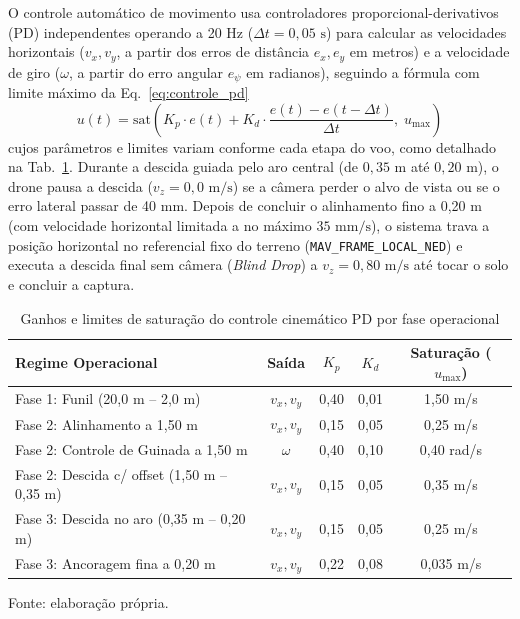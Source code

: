 O controle automático de movimento usa controladores proporcional-derivativos (PD) independentes operando a 20 Hz ($\Delta t = 0,05\text{ s}$) para calcular as velocidades horizontais ($v_x, v_y$, a partir dos erros de distância $e_x, e_y$ em metros) e a velocidade de giro ($\omega$, a partir do erro angular $e_\psi$ em radianos), seguindo a fórmula com limite máximo da Eq.~\eqref{eq:controle_pd}
\begin{equation}
	u(t) = \text{sat}\left(K_p \cdot e(t) + K_d \cdot \frac{e(t) - e(t - \Delta t)}{\Delta t},\; u_{\max}\right)
	\label{eq:controle_pd}
\end{equation}
cujos parâmetros e limites variam conforme cada etapa do voo, como detalhado na Tab.~\ref{tab:ganhos_controle_pd}. Durante a descida guiada pelo aro central (de $0,35\text{ m}$ até $0,20\text{ m}$), o drone pausa a descida ($v_z = 0,0\text{ m/s}$) se a câmera perder o alvo de vista ou se o erro lateral passar de 40 mm. Depois de concluir o alinhamento fino a 0,20 m (com velocidade horizontal limitada a no máximo $35\text{ mm/s}$), o sistema trava a posição horizontal no referencial fixo do terreno (\texttt{MAV\_FRAME\_LOCAL\_NED}) e executa a descida final sem câmera (\textit{Blind Drop}) a $v_z = 0,80\text{ m/s}$ até tocar o solo e concluir a captura.

\begin{table}[H]
	\centering
	\small
	\setlength{\tabcolsep}{5pt}
	\captionsetup{justification=centering}
	\caption{Ganhos e limites de saturação do controle cinemático PD por fase operacional}
	\label{tab:ganhos_controle_pd}
	\vspace{0.2cm}
	\begin{tabular}{lcccc}
		\hline
		\textbf{Regime Operacional} & \textbf{Saída} & \textbf{$K_p$} & \textbf{$K_d$} & \textbf{Saturação ($u_{\max}$)} \\
		\hline
		Fase 1: Funil (20,0 m -- 2,0 m)                & $v_x, v_y$ & 0,40 & 0,01 & 1,50 m/s \\
		Fase 2: Alinhamento a 1,50 m                   & $v_x, v_y$ & 0,15 & 0,05 & 0,25 m/s \\
		Fase 2: Controle de Guinada a 1,50 m           & $\omega$   & 0,40 & 0,10 & 0,40 rad/s \\
		Fase 2: Descida c/ offset (1,50 m -- 0,35 m)   & $v_x, v_y$ & 0,15 & 0,05 & 0,35 m/s \\
		Fase 3: Descida no aro (0,35 m -- 0,20 m)      & $v_x, v_y$ & 0,15 & 0,05 & 0,25 m/s \\
		Fase 3: Ancoragem fina a 0,20 m                & $v_x, v_y$ & 0,22 & 0,08 & 0,035 m/s \\
		\hline
	\end{tabular}
	\vspace{0.2cm}
	\begin{flushleft}
		\footnotesize Fonte: elaboração própria.
	\end{flushleft}
\end{table}

